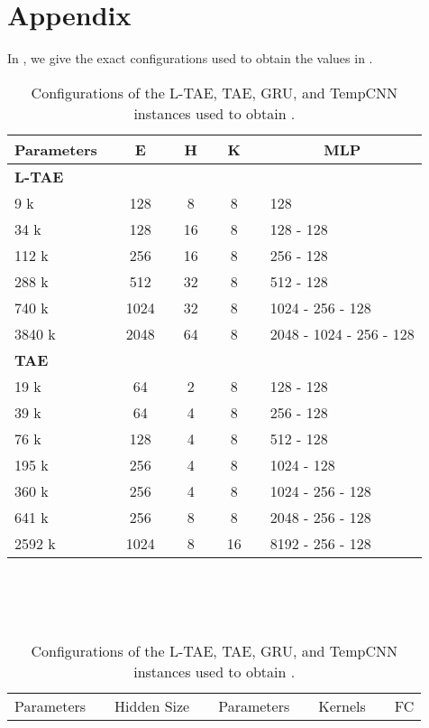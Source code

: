 \documentclass[runningheads]{llncs}
\begin{document}
\section*{Appendix}


In , we give the exact configurations used to obtain the values in .
\begin{table}[]
\caption{Configurations of the L-TAE, TAE, GRU, and TempCNN instances used to obtain .}
\label{tab:all_config}
\label{tab:details1}
\centering
\begin{tabular}{lcccccccl}
Parameters &\phantom{ab}& E    &\phantom{ab}& H &\phantom{ab} & K &\phantom{ab}& \multicolumn{1}{c}{MLP}   \\ \toprule
\textbf{L-TAE} & & & & \\\hline
9 k        && 128  && 8  && 8 && 128                        \\
34 k        && 128  && 16 && 8 && 128 -  128                 \\
112 k       && 256  && 16 && 8 && 256 -  128                 \\
288 k       && 512  && 32 && 8 && 512 -  128                 \\
740 k       && 1024 && 32 && 8 && 1024 -  256 -  128         \\
3840 k    && 2048 && 64 && 8 && 2048 -  1024 -  256 -  128 \\\hline
\textbf{TAE} &\\\hline
19 k       && 64  && 2 && 8  && 128 -  128              \\
39 k       && 64  && 4 && 8  && 256 -  128              \\
76 k      && 128  && 4 && 8  && 512 -  128              \\
195 k      && 256  && 4 && 8  && 1024 -  128             \\
360 k      && 256  && 4 && 8  && 1024 -  256 -  128      \\
641 k      && 256  && 8 && 8  && 2048 -  256 -  128      \\
2592 k   && 1024 && 8 && 16 && 8192 -  256 -  128      
\\\bottomrule
\end{tabular}
\\~\\~\\
\centering
\begin{tabular}{lccclclcl}
Parameters &\phantom{ab}& Hidden Size & \phantom{abcdef} & Parameters & \phantom{ab}&Kernels &\phantom{ab}& FC \\\cmidrule{1-3} \cmidrule{5-9} 

\end{tabular}
\end{table}
\end{document}
